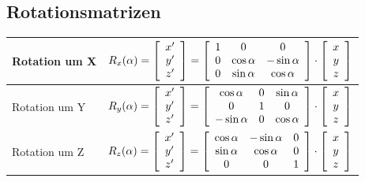 \documentclass[8pt,a4paper,landscape]{scrartcl}
\begin{document}
\begin{multicols*}{3}
\subsection*{Rotationsmatrizen}
\begin{tabularx}{\columnwidth}{X|m{}}
	Rotation um X & $R_x(\alpha) = \left[\begin{Array}{c} x' \\ y' \\ z' \end{Array}\right]
	= \left[\begin{Array}{ccc}
		1 & 0 & 0\\
		0 & \cos\alpha & -\sin\alpha\\
		0 & \sin\alpha & \cos\alpha
	\end{Array}\right]\cdot\left[\begin{Array}{c}
		x\\
		y\\
		z
	\end{Array}\right]$\\ \hline
Rotation um Y & $R_y(\alpha) = \left[\begin{Array}{c} x' \\ y' \\ z' \end{Array}\right]
= \left[\begin{Array}{ccc}
	\cos\alpha & 0 & \sin\alpha\\
	0 & 1 & 0 \\
	-\sin\alpha & 0 & \cos\alpha
\end{Array}\right]\cdot\left[\begin{Array}{c}
	x\\
	y\\
	z
\end{Array}\right]$\\ \hline
Rotation um Z & $R_z(\alpha) = \left[\begin{Array}{c} x' \\ y' \\ z' \end{Array}\right]
= \left[\begin{Array}{ccc}
	\cos\alpha & -\sin\alpha & 0\\
	\sin\alpha & \cos\alpha & 0\\
	0 & 0 & 1
\end{Array}\right]\cdot\left[\begin{Array}{c}
	x\\
	y\\
	z
\end{Array}\right]$\\ \hline

\end{tabularx}
\end{multicols*}
\end{document}

